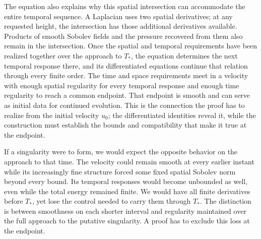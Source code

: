 The equation also explains why this spatial intersection can accommodate
the entire temporal sequence. A Laplacian uses two spatial derivatives;
at any requested height, the intersection has those additional derivatives
available. Products of smooth Sobolev fields and the pressure recovered from
them also remain in the intersection. Once the spatial and temporal
requirements have been realized together over the approach to \(T_*\),
the equation determines the next temporal response there, and its
differentiated equations continue that relation through every finite order.
The time and space requirements meet in a velocity with enough spatial
regularity for every temporal response and enough time regularity to reach
a common endpoint. That endpoint is smooth and can serve as initial data
for continued evolution. This is the connection the proof has to realize
from the initial velocity \(u_0\); the differentiated identities reveal it, while the construction
must establish the bounds and compatibility that make it true at the endpoint.

If a singularity were to form, we would expect the opposite behavior on
the approach to that time. The velocity could remain smooth at every earlier
instant while its increasingly fine structure forced some fixed spatial
Sobolev norm beyond every bound. Its temporal responses would become
unbounded as well, even while the total energy remained finite. We would
have all finite derivatives before \(T_*\), yet lose the control needed to
carry them through \(T_*\). The distinction is between smoothness on each
shorter interval and regularity maintained over the full approach to the
putative singularity. A proof has to exclude this loss at the endpoint.

